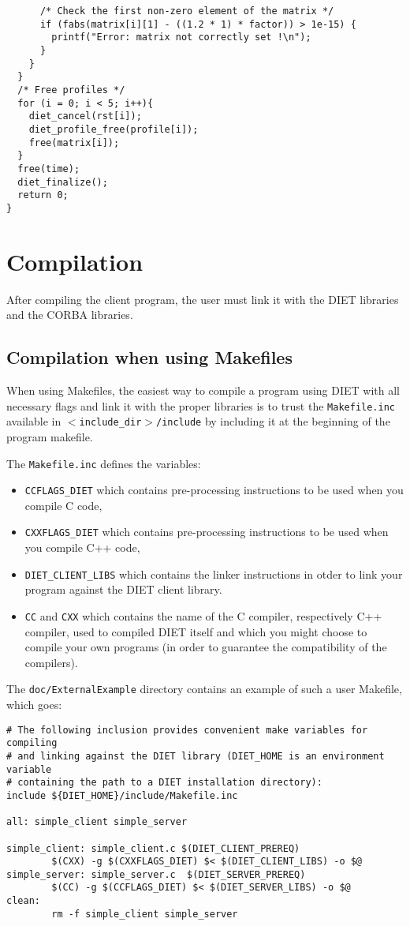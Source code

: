 {\begin{verbatim}
      /* Check the first non-zero element of the matrix */
      if (fabs(matrix[i][1] - ((1.2 * 1) * factor)) > 1e-15) {
        printf("Error: matrix not correctly set !\n");
      }
    }
  }
  /* Free profiles */
  for (i = 0; i < 5; i++){
    diet_cancel(rst[i]);
    diet_profile_free(profile[i]);
    free(matrix[i]);
  }
  free(time);
  diet_finalize();
  return 0;
}
\end{verbatim}
}

\section{Compilation}
\label{sec:cl_comp}

After compiling the client program, the user must link it with the
DIET libraries and the CORBA libraries.

\subsection{Compilation when using Makefiles}

When using Makefiles, the easiest way to compile a program using DIET
with all necessary flags and link it with the proper libraries is to
trust the \texttt{Makefile.inc} available in 
\texttt{$<$include\_dir$>$/include} by including it at the beginning
of the program makefile.

The \texttt{Makefile.inc} defines the variables:
\begin{itemize}
\item \texttt{CCFLAGS\_DIET} which contains pre-processing instructions 
to be used when you compile C code,
\item \texttt{CXXFLAGS\_DIET} which contains pre-processing instructions
to be used when you compile C++ code,
\item \texttt{DIET\_CLIENT\_LIBS} which contains the linker instructions
in otder to link your program against the DIET client library.
\item \texttt{CC} and \texttt{CXX} which contains the name of the C compiler,
respectively C++ compiler, used to compiled DIET itself and which you
might choose to compile your own programs (in order to guarantee the 
compatibility of the compilers).
\end{itemize}
\noindent
The \texttt{doc/ExternalExample} directory contains an example of
such a user Makefile, which goes:
{\footnotesize
\begin{verbatim}
# The following inclusion provides convenient make variables for compiling
# and linking against the DIET library (DIET_HOME is an environment variable
# containing the path to a DIET installation directory):
include ${DIET_HOME}/include/Makefile.inc

all: simple_client simple_server

simple_client: simple_client.c $(DIET_CLIENT_PREREQ)
        $(CXX) -g $(CXXFLAGS_DIET) $< $(DIET_CLIENT_LIBS) -o $@
simple_server: simple_server.c  $(DIET_SERVER_PREREQ)
        $(CC) -g $(CCFLAGS_DIET) $< $(DIET_SERVER_LIBS) -o $@
clean:
        rm -f simple_client simple_server

\end{verbatim}
}

